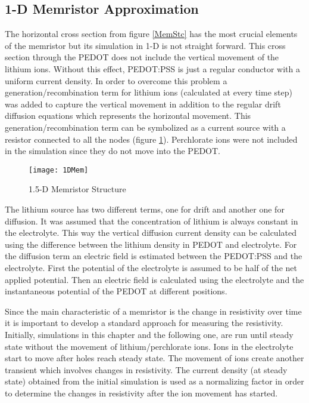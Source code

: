 \begin{doublespace}
\clearpage
\section{1-D Memristor Approximation}

The horizontal cross section from figure \ref{MemStc} has the most crucial elements of the memristor but its simulation in 1-D is not straight forward. This cross section through the PEDOT does not include the vertical movement of the lithium ions. Without this effect, PEDOT:PSS is just a regular conductor with a uniform current density. In order to overcome this problem a generation/recombination term for lithium ions (calculated at every time step) was added to capture the vertical movement in addition to the regular drift diffusion equations which represents the horizontal movement. This generation/recombination term can be symbolized as a current source with a resistor connected to all the nodes (figure \ref{MemStc15}). Perchlorate ions were not included in the simulation since they do not move into the PEDOT.

\begin{figure}[!htp]
\centering
\texttt{[image: 1DMem]}
\caption{1.5-D Memristor Structure} 
\label{MemStc15}
\end{figure}

The lithium source has two different terms, one for drift and another one for diffusion. It was assumed that the concentration of lithium is always constant in the electrolyte. This way the vertical diffusion current density can be calculated using the difference between the lithium density in PEDOT and electrolyte. For the diffusion term an electric field is estimated between the PEDOT:PSS and the electrolyte. First the potential of the electrolyte is assumed to be half of the net applied potential. Then an electric field is calculated using the electrolyte and the instantaneous potential of the PEDOT at different positions.

Since the main characteristic of a memristor is the change in resistivity over time it is important to develop a standard approach for measuring the resistivity. Initially, simulations in this chapter and the following one, are run until steady state without the movement of lithium/perchlorate ions. Ions in the electrolyte start to move after holes reach steady state. The movement of ions create another transient which involves changes in resistivity. The current density (at steady state) obtained from the initial simulation is used as a normalizing factor in order to determine the changes in resistivity after the ion movement has started.


\end{doublespace}
